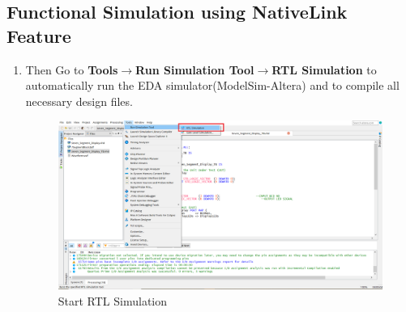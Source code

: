 \documentclass[12pt,singleside,a4paper]{article}
\begin{document}
  

  
\subsection{Functional Simulation using NativeLink Feature}
    \begin{enumerate}
        
        \item Then Go to \textbf{Tools}$\rightarrow$\textbf{Run Simulation Tool}$\rightarrow$\textbf{RTL Simulation} to automatically run the EDA simulator(ModelSim-Altera) and to compile all necessary design files.
        \begin{figure}[H]
        \centering
        \includegraphics[width=14cm,keepaspectratio]{Simulation/Simulation1.png}
        \caption{Start RTL Simulation}
        \end{figure}


\end{enumerate}
\end{document}
